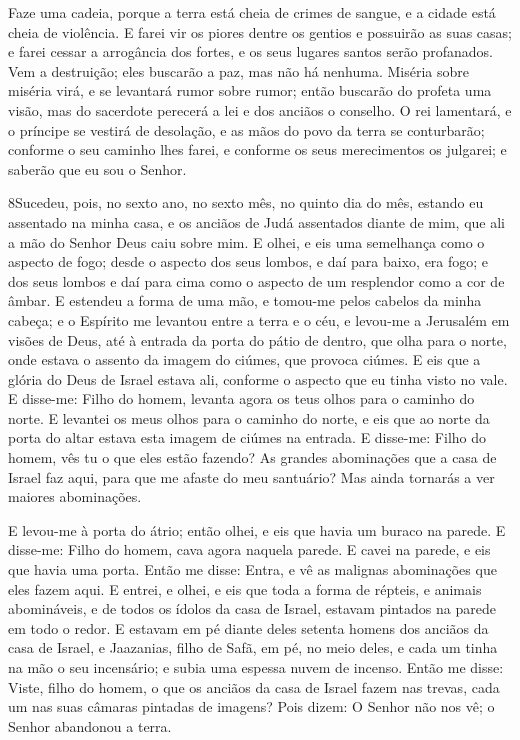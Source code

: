 Faze uma cadeia, porque a terra está cheia de crimes de sangue, e
a cidade está cheia de violência. E farei vir os piores
dentre os gentios e possuirão as suas casas; e farei cessar a
arrogância dos fortes, e os seus lugares santos serão profanados.
Vem a destruição; eles buscarão a paz, mas não há nenhuma.
Miséria sobre miséria virá, e se levantará rumor sobre rumor;
então buscarão do profeta uma visão, mas do sacerdote perecerá a lei
e dos anciãos o conselho. O rei lamentará, e o príncipe se
vestirá de desolação, e as mãos do povo da terra se conturbarão;
conforme o seu caminho lhes farei, e conforme os seus merecimentos
os julgarei; e saberão que eu sou o Senhor.

\medskip

\lettrine{8} Sucedeu, pois, no sexto ano, no sexto mês, no
quinto dia do mês, estando eu assentado na minha casa, e os anciãos
de Judá assentados diante de mim, que ali a mão do Senhor Deus caiu
sobre mim. E olhei, e eis uma semelhança como o aspecto de fogo;
desde o aspecto dos seus lombos, e daí para baixo, era fogo; e dos
seus lombos e daí para cima como o aspecto de um resplendor como a
cor de âmbar. E estendeu a forma de uma mão, e tomou-me pelos
cabelos da minha cabeça; e o Espírito me levantou entre a terra e o
céu, e levou-me a Jerusalém em visões de Deus, até à entrada da
porta do pátio de dentro, que olha para o norte, onde estava o
assento da imagem do ciúmes, que provoca ciúmes. E eis que a
glória do Deus de Israel estava ali, conforme o aspecto que eu tinha
visto no vale. E disse-me: Filho do homem, levanta agora os teus
olhos para o caminho do norte. E levantei os meus olhos para o
caminho do norte, e eis que ao norte da porta do altar estava esta
imagem de ciúmes na entrada. E disse-me: Filho do homem, vês tu
o que eles estão fazendo? As grandes abominações que a casa de
Israel faz aqui, para que me afaste do meu santuário? Mas ainda
tornarás a ver maiores abominações.

E levou-me à porta do átrio; então olhei, e eis que havia um
buraco na parede. E disse-me: Filho do homem, cava agora naquela
parede. E cavei na parede, e eis que havia uma porta. Então me
disse: Entra, e vê as malignas abominações que eles fazem aqui.
E entrei, e olhei, e eis que toda a forma de répteis, e
animais abomináveis, e de todos os ídolos da casa de Israel, estavam
pintados na parede em todo o redor. E estavam em pé diante
deles setenta homens dos anciãos da casa de Israel, e Jaazanias,
filho de Safã, em pé, no meio deles, e cada um tinha na mão o seu
incensário; e subia uma espessa nuvem de incenso. Então me
disse: Viste, filho do homem, o que os anciãos da casa de Israel
fazem nas trevas, cada um nas suas câmaras pintadas de imagens? Pois
dizem: O Senhor não nos vê; o Senhor abandonou a terra.

